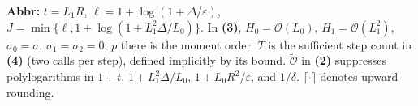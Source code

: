 \begin{table}[tp]
\begin{threeparttable}
\begin{tabularx}{\linewidth}{@{}>{\raggedright\arraybackslash}p{0.20\linewidth}>{\raggedright\arraybackslash}p{0.32\linewidth}>{\raggedright\arraybackslash}p{0.25\linewidth}>{\raggedright\arraybackslash}X@{}}
\bottomrule
\end{tabularx}
\begin{tablenotes}[flushleft]\footnotesize
\item[] \textbf{Abbr:} $t=L_1R$, $\ell=1+\log(1+\Delta/\varepsilon)$, $J=\min\{\ell,1+\log(1+L_1^2\Delta/L_0)\}$. In \textbf{(3)}, $H_0=\mathcal{O}(L_0)$, $H_1=\mathcal{O}(L_1^2)$, $\sigma_0=\sigma$, $\sigma_1=\sigma_2=0$; $p$ there is the moment order. $T$ is the sufficient step count in \textbf{(4)} (two calls per step), defined implicitly by its bound. $\widetilde{\mathcal{O}}$ in \textbf{(2)} suppresses polylogarithms in $1+t$, $1+L_1^2\Delta/L_0$, $1+L_0R^2/\varepsilon$, and $1/\delta$. $\lceil\cdot\rceil$ denotes upward rounding.
\end{tablenotes}
\end{threeparttable}
\end{table}
\clearpage
